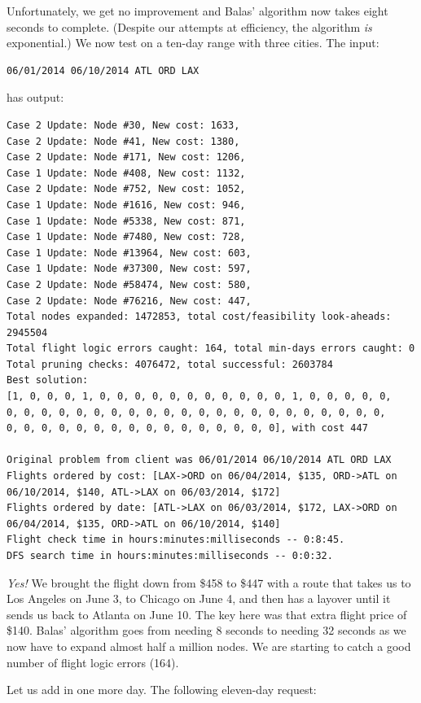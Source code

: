 \documentclass{article}
\begin{document}
Unfortunately, we get no improvement and Balas' algorithm now takes eight seconds to complete. (Despite our attempts at efficiency, the algorithm
\emph{is} exponential.) We now test on a ten-day range with three cities. The input:

\begin{verbatim}
06/01/2014 06/10/2014 ATL ORD LAX
\end{verbatim}

has output:

\scriptsize
\begin{verbatim}
Case 2 Update: Node #30, New cost: 1633, 
Case 2 Update: Node #41, New cost: 1380, 
Case 2 Update: Node #171, New cost: 1206, 
Case 1 Update: Node #408, New cost: 1132, 
Case 2 Update: Node #752, New cost: 1052, 
Case 1 Update: Node #1616, New cost: 946, 
Case 1 Update: Node #5338, New cost: 871, 
Case 1 Update: Node #7480, New cost: 728, 
Case 1 Update: Node #13964, New cost: 603, 
Case 1 Update: Node #37300, New cost: 597, 
Case 2 Update: Node #58474, New cost: 580, 
Case 2 Update: Node #76216, New cost: 447, 
Total nodes expanded: 1472853, total cost/feasibility look-aheads: 2945504
Total flight logic errors caught: 164, total min-days errors caught: 0
Total pruning checks: 4076472, total successful: 2603784
Best solution:
[1, 0, 0, 0, 1, 0, 0, 0, 0, 0, 0, 0, 0, 0, 0, 0, 1, 0, 0, 0, 0, 0,
0, 0, 0, 0, 0, 0, 0, 0, 0, 0, 0, 0, 0, 0, 0, 0, 0, 0, 0, 0, 0, 0,
0, 0, 0, 0, 0, 0, 0, 0, 0, 0, 0, 0, 0, 0, 0, 0], with cost 447

Original problem from client was 06/01/2014 06/10/2014 ATL ORD LAX
Flights ordered by cost: [LAX->ORD on 06/04/2014, $135, ORD->ATL on 06/10/2014, $140, ATL->LAX on 06/03/2014, $172]
Flights ordered by date: [ATL->LAX on 06/03/2014, $172, LAX->ORD on 06/04/2014, $135, ORD->ATL on 06/10/2014, $140]
Flight check time in hours:minutes:milliseconds -- 0:8:45.
DFS search time in hours:minutes:milliseconds -- 0:0:32.
\end{verbatim}
\normalsize

\emph{Yes!} We brought the flight down from \$458 to \$447 with a route that takes us to Los Angeles on June 3, to Chicago on June 4, and then has a
layover until it sends us back to Atlanta on June 10. The key here was that extra flight price of \$140. Balas' algorithm goes from needing 8 seconds
to needing 32 seconds as we now have to expand almost half a million nodes. We are starting to catch a good number of flight logic errors (164).

Let us add in one more day. The following eleven-day request:
\end{document}
